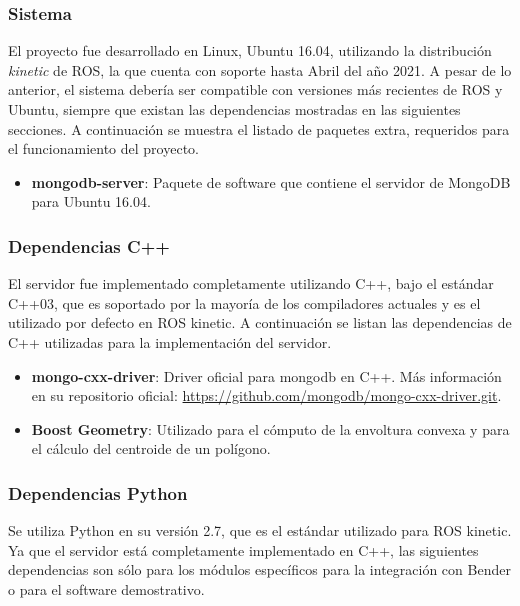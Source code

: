 
\subsubsection{Sistema}

El proyecto fue desarrollado en Linux, Ubuntu 16.04, utilizando la distribución \textit{kinetic} de ROS, la que cuenta con soporte hasta Abril del año 2021. A pesar de lo anterior, el sistema debería ser compatible con versiones más recientes de ROS y Ubuntu, siempre que existan las dependencias mostradas en las siguientes secciones. A continuación se muestra el listado de paquetes extra, requeridos para el funcionamiento del proyecto.

\begin{itemize}
\item {\bfseries mongodb-server}: Paquete de software que contiene el servidor de MongoDB para Ubuntu 16.04.
\end{itemize}


\subsubsection{Dependencias C++}

El servidor fue implementado completamente utilizando C++, bajo el estándar C++03, que es soportado por la mayoría de los compiladores actuales y es el utilizado por defecto en ROS kinetic. A continuación se listan las dependencias de C++ utilizadas para la implementación del servidor.

\begin{itemize}
	\item {\bfseries mongo-cxx-driver}: Driver oficial para mongodb en C++. Más información en su repositorio oficial: \url{https://github.com/mongodb/mongo-cxx-driver.git}. 
	\item {\bfseries Boost Geometry}: Utilizado para el cómputo de la envoltura convexa y para el cálculo del centroide de un polígono.
\end{itemize}


\subsubsection{Dependencias Python}

Se utiliza Python en su versión 2.7, que es el estándar utilizado para ROS kinetic. Ya que el servidor está completamente implementado en C++, las siguientes dependencias son sólo para los módulos específicos para la integración con Bender o para el software demostrativo.

